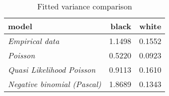 \begin{wraptable}{r}{2.5in}

\caption{\label{tab:variance_comparison}Fitted variance comparison}
\centering
\fontsize{9}{11}\selectfont
\begin{tabular}[t]{>{}lrr}
\toprule
model & black & white\\
\midrule
\em{Empirical data} & 1.1498 & 0.1552\\
\em{Poisson} & 0.5220 & 0.0923\\
\em{Quasi Likelihood Poisson} & 0.9113 & 0.1610\\
\em{Negative binomial (Pascal)} & 1.8689 & 0.1343\\
\bottomrule
\end{tabular}
\end{wraptable}

